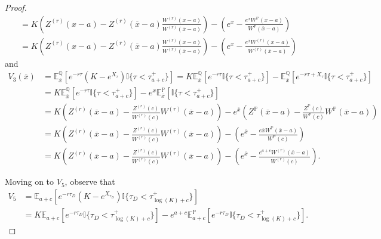 \documentclass[10pt,a4paper]{amsart}
\def\E{{\mathbb{E}}}
\def\P{{\mathbb{P}}}
\def\Q{{\mathbb{Q}}}
\def \R{{{\rm I{\!}\rm R}}}
\def \I{{\mathbb{I}}}
\def\P{{\mathbb P}} \def\le{\left} \def\ri{\right} \def\i{\infty}
\def\E{{\mathbb E}} \def\PP{\mc P} \def\Z{{\mathbb Z}} \def\R{{\mathbb R}}
\begin{document}
\begin{proof}
\begin{align}
				\nonumber & = K\left( Z^{(r)}(x-a) - Z^{(r)}(\overline{x}-a)\frac{W^{(r)}(x-a)}{W^{(r)}(\overline{x}-a)} \right) - \left( e^x - \frac{e^x W^\P(x-a)}{W^\P(\overline{x}-a)} \right) \\
				& = K\left( Z^{(r)}(x-a) - Z^{(r)}(\overline{x}-a)\frac{W^{(r)}(x-a)}{W^{(r)}(\overline{x}-a)} \right) - \left( e^x - \frac{e^{\overline{x}} W^{(r)}(x-a)}{W^{(r)}(\overline{x}-a)} \right)\label{V1}
			\end{align}
			and
			\begin{align}
				\nonumber	V_3(\overline{x}) &= \E^\Q_{\overline{x}}\left[ e^{-r\tau} \left( K - e^{X_\tau} \right) \I
				\{ \tau < \tau_{a+c}^+ \} \right]  = K\E^\Q_{\overline{x}} \left[ e^{-r\tau} \I
				\{ \tau < \tau_{a+c}^+ \} \right] - \E^\Q_{\overline{x}}\left[ e^{-r\tau + X_\tau} \I
				\{ \tau < \tau_{a+c}^+ \} \right] \\
				\nonumber & =  K\E^\Q_{\overline{x}} \left[ e^{-r\tau} \I
				\{ \tau < \tau_{a+c}^+ \} \right] - e^x \E^\P_{\overline{x}}\left[ \I
				\{ \tau < \tau_{a+c}^+ \} \right] \\
				\nonumber &=  K\left( Z^{(r)}(\overline{x}-a) - \frac{Z^{(r)}(c)}{W^{(r)}(c)}W^{(r)}(\overline{x}-a) \right) -e^{\overline{x}}\left( Z^{\P}(\overline{x}-a) - \frac{Z^{\P}(c)}{W^{\P}(c)}W^{\P}(\overline{x}-a) \right) \\
				\nonumber & =K\left( Z^{(r)}(\overline{x}-a) - \frac{Z^{(r)}(c)}{W^{(r)}(c)}W^{(r)}(\overline{x}-a) \right) - \left( e^{\overline{x}} - \frac{e{\overline{x}} W^\P(\overline{x}-a)}{W^\P(c)} \right) \\
				& =K\left( Z^{(r)}(\overline{x}-a) - \frac{Z^{(r)}(c)}{W^{(r)}(c)}W^{(r)}(\overline{x}-a) \right) - \left( e^{\overline{x}} - \frac{e^{a+c} W^{(r)}(\overline{x}-a)}{W^{(r)}(c)} \right).\label{V3}
			\end{align}
			
			Moving on to $V_5$, observe that	
			\begin{align*}
				V_5 &= \E_{a+c} \left[ e^{-r\tau_D}\left( K - e^{X_{\tau_D}} \right) \I \{ \tau_D < \tau_{\log(K)+c}^+ \} \right] \\
				\nonumber & = K\E_{a+c} \left[ e^{-r\tau_D} \I \{ \tau_D < \tau_{\log(K)+c}^+ \} \right] - e^{a+c}\E^\P_{a+c} \left[ e^{-r\tau_D} \I \{ \tau_D < \tau_{\log(K)+c}^+ \} \right].
			\end{align*}
			

\end{proof}
\end{document}
